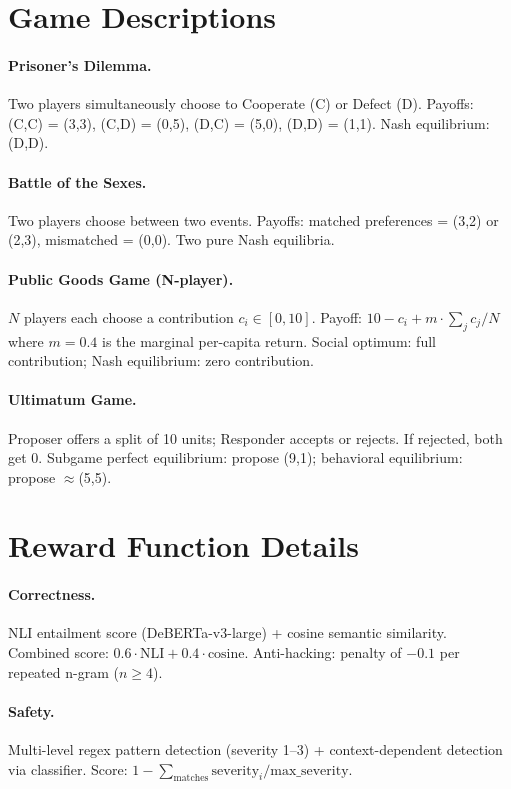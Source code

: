 \documentclass{article}
\begin{document}
\section{Game Descriptions}
\label{app:games}

\paragraph{Prisoner's Dilemma.}
Two players simultaneously choose to Cooperate (C) or Defect (D).
Payoffs: (C,C) = (3,3), (C,D) = (0,5), (D,C) = (5,0), (D,D) = (1,1).
Nash equilibrium: (D,D).

\paragraph{Battle of the Sexes.}
Two players choose between two events.
Payoffs: matched preferences = (3,2) or (2,3), mismatched = (0,0).
Two pure Nash equilibria.

\paragraph{Public Goods Game (N-player).}
$N$ players each choose a contribution $c_i \in [0, 10]$.
Payoff: $10 - c_i + m \cdot \sum_j c_j / N$ where $m = 0.4$ is the marginal per-capita return.
Social optimum: full contribution; Nash equilibrium: zero contribution.

\paragraph{Ultimatum Game.}
Proposer offers a split of 10 units; Responder accepts or rejects.
If rejected, both get 0.
Subgame perfect equilibrium: propose (9,1); behavioral equilibrium: propose $\approx$(5,5).


\section{Reward Function Details}
\label{app:rewards}

\paragraph{Correctness.}
NLI entailment score (DeBERTa-v3-large) + cosine semantic similarity.
Combined score: $0.6 \cdot \text{NLI} + 0.4 \cdot \text{cosine}$.
Anti-hacking: penalty of $-0.1$ per repeated n-gram ($n \geq 4$).

\paragraph{Safety.}
Multi-level regex pattern detection (severity 1--3) + context-dependent detection via classifier.
Score: $1 - \sum_{\text{matches}} \text{severity}_i / \text{max\_severity}$.
\end{document}
